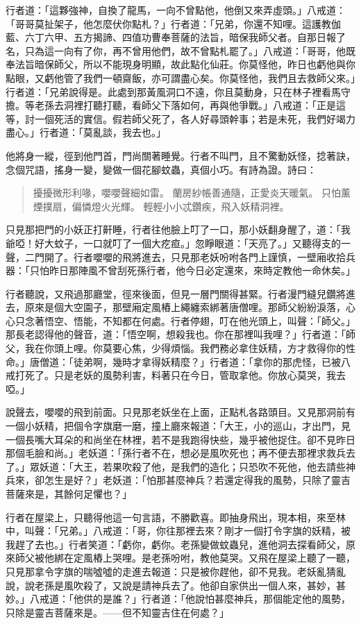 行者道：「這夥強神，自換了龍馬，一向不曾點他，他倒又來弄虛頭。」八戒道：「哥哥莫扯架子，他怎麼伏你點札？」行者道：「兄弟，你還不知哩。這護教伽藍、六丁六甲、五方揭諦、四值功曹奉菩薩的法旨，暗保我師父者。自那日報了名，只為這一向有了你，再不曾用他們，故不曾點札罷了。」八戒道：「哥哥，他既奉法旨暗保師父，所以不能現身明顯，故此點化仙莊。你莫怪他，昨日也虧他與你點眼，又虧他管了我們一頓齋飯，亦可謂盡心矣。你莫怪他，我們且去救師父來。」行者道：「兄弟說得是。此處到那黃風洞口不遠，你且莫動身，只在林子裡看馬守擔。等老孫去洞裡打聽打聽，看師父下落如何，再與他爭戰。」八戒道：「正是這等，討一個死活的實信。假若師父死了，各人好尋頭幹事；若是未死，我們好竭力盡心。」行者道：「莫亂談，我去也。」

他將身一縱，徑到他門首，門尚關著睡覺。行者不叫門，且不驚動妖怪，捻著訣，念個咒語，搖身一變，變做一個花腳蚊蟲，真個小巧。有詩為證。詩曰：
\begin{quote}
擾擾微形利喙，嚶嚶聲細如雷。
蘭房紗帳善通隨，正愛炎天暖氣。
只怕薰煙撲扇，偏憐燈火光輝。
輕輕小小忒鑽疾，飛入妖精洞裡。
\end{quote}

只見那把門的小妖正打鼾睡，行者往他臉上叮了一口，那小妖翻身醒了，道：「我爺啞！好大蚊子，一口就叮了一個大疙疸。」忽睜眼道：「天亮了。」又聽得支的一聲，二門開了。行者嚶嚶的飛將進去，只見那老妖吩咐各門上謹慎，一壁廂收拾兵器：「只怕昨日那陣風不曾刮死孫行者，他今日必定還來，來時定教他一命休矣。」

行者聽說，又飛過那廳堂，徑來後面，但見一層門關得甚緊。行者漫門縫兒鑽將進去，原來是個大空園子，那壁廂定風樁上繩纏索綁著唐僧哩。那師父紛紛淚落，心心只念著悟空、悟能，不知都在何處。行者停翅，叮在他光頭上，叫聲：「師父。」那長老認得他的聲音，道：「悟空啊，想殺我也。你在那裡叫我哩？」行者道：「師父，我在你頭上哩。你莫要心焦，少得煩惱。我們務必拿住妖精，方才救得你的性命。」唐僧道：「徒弟啊，幾時才拿得妖精麼？」行者道：「拿你的那虎怪，已被八戒打死了。只是老妖的風勢利害，料著只在今日，管取拿他。你放心莫哭，我去啞。」

說聲去，嚶嚶的飛到前面。只見那老妖坐在上面，正點札各路頭目。又見那洞前有一個小妖精，把個令字旗磨一磨，撞上廳來報道：「大王，小的巡山，才出門，見一個長嘴大耳朵的和尚坐在林裡，若不是我跑得快些，幾乎被他捉住。卻不見昨日那個毛臉和尚。」老妖道：「孫行者不在，想必是風吹死也；再不便去那裡求救兵去了。」眾妖道：「大王，若果吹殺了他，是我們的造化；只恐吹不死他，他去請些神兵來，卻怎生是好？」老妖道：「怕那甚麼神兵？若還定得我的風勢，只除了靈吉菩薩來是，其餘何足懼也？」

行者在屋梁上，只聽得他這一句言語，不勝歡喜。即抽身飛出，現本相，來至林中，叫聲：「兄弟。」八戒道：「哥，你往那裡去來？剛才一個打令字旗的妖精，被我趕了去也。」行者笑道：「虧你，虧你。老孫變做蚊蟲兒，進他洞去探看師父，原來師父被他綁在定風樁上哭哩。是老孫吩咐，教他莫哭。又飛在屋梁上聽了一聽，只見那拿令字旗的喘噓噓的走進去報道：只是被你趕他，卻不見我。老妖亂猜亂說，說老孫是風吹殺了，又說是請神兵去了。他卻自家供出一個人來，甚妙，甚妙。」八戒道：「他供的是誰？」行者道：「他說怕甚麼神兵，那個能定他的風勢，只除是靈吉菩薩來是。——但不知靈吉住在何處？」

